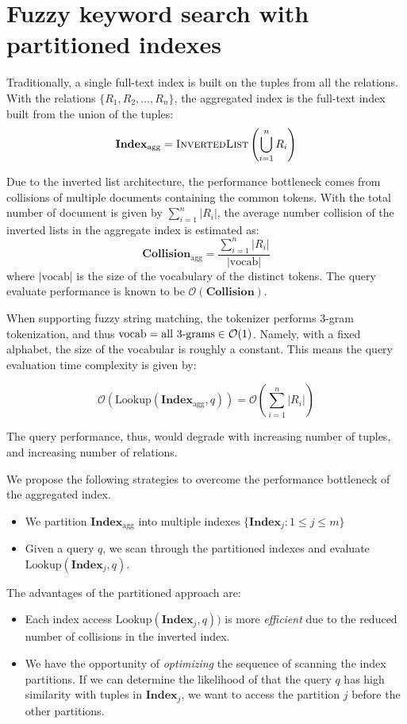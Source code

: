 \documentclass[conference]{IEEEtran}
\begin{document}
\section{Fuzzy keyword search with partitioned indexes}

Traditionally, a single full-text index is built on the tuples from all the relations. With the relations $\{R_1, R_2, \dots, R_n\}$, the aggregated index
is the full-text index built from the union of the tuples:
$$\mathbf{Index}_\mathrm{agg} = \textsc{InvertedList}\left(\bigcup_{i=1}^n R_i\right) $$

Due to the inverted list architecture, the performance bottleneck comes
from collisions of multiple documents containing the common tokens.  With the total number of document is given by $\sum_{i=1}^n |R_i|$, the average
number collision of the inverted lists in the aggregate index is estimated as:
$$
\mathbf{Collision}_\mathrm{agg} = \frac{
  \sum_{i=1}^n |R_i|
}{
  |\mathrm{vocab}|
}
$$
where $|\mathrm{vocab}|$ is the size of the vocabulary of the distinct tokens.
The query evaluate performance is known to be $\mathcal{O}(\mathbf{Collision})$.

When supporting fuzzy string matching, the tokenizer performs 3-gram tokenization,
and thus $\mathrm{vocab} = \makebox{all 3-grams} \in\mathcal{O}(1)$.  Namely,
with a fixed alphabet, the size of the vocabular is roughly a constant.  This means
the query evaluation time complexity is given by:

$$
\mathcal{O}(\mathrm{Lookup}(\mathbf{Index}_\mathrm{agg}, q)) = \mathcal{O}\left(\sum_{i=1}^n |R_i|\right)
$$

The query performance, thus, would degrade with increasing number of tuples, and increasing number of relations.

We propose the following strategies to overcome the performance bottleneck
of the aggregated index.

\begin{itemize}
\item We partition $\mathbf{Index}_\mathrm{agg}$ into multiple indexes
  $\{\mathbf{Index}_j: 1 \leq j \leq m\}$
\item Given a query $q$, we scan through the partitioned indexes
  and evaluate $\mathrm{Lookup}(\mathbf{Index}_j, q)$.
\end{itemize}

The advantages of the partitioned approach are:

\begin{itemize}
\item Each index access $\mathrm{Lookup}(\mathbf{Index}_j, q))$ is 
more {\em efficient} due to the reduced number of collisions in
the inverted index.

\item We have the opportunity of {\em optimizing} the sequence of scanning
the index partitions.  If we can determine the likelihood
of that the query $q$ has high similarity with tuples in $\mathbf{Index}_j$, we want
to access the partition $j$ before the other partitions.
\end{itemize}
\end{document}
